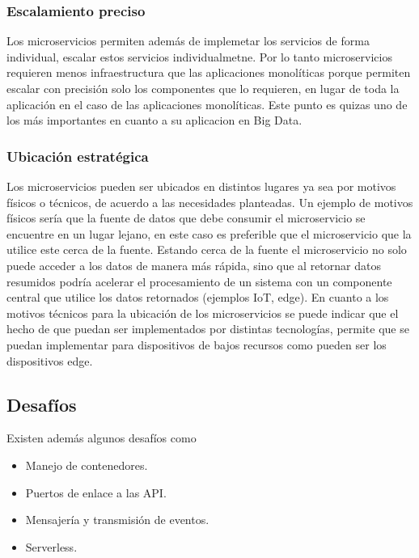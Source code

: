 \subsubsection{Escalamiento preciso}

    Los microservicios permiten además de implemetar los servicios de forma individual, escalar estos servicios individualmetne. Por lo tanto microservicios requieren menos infraestructura que las aplicaciones monolíticas porque permiten escalar con precisión solo los componentes que lo requieren, en lugar de toda la aplicación en el caso de las aplicaciones monolíticas. Este punto es quizas uno de los más importantes en cuanto a su aplicacion en Big Data.\par
    
\subsubsection{Ubicación estratégica}

    Los microservicios pueden ser ubicados en distintos lugares ya sea por motivos físicos o técnicos, de acuerdo a las necesidades planteadas. Un ejemplo de motivos físicos sería que la fuente de datos que debe consumir el microservicio se encuentre en un lugar lejano, en este caso es preferible que el microservicio que la utilice este cerca de la fuente. Estando cerca de la fuente el microservicio no solo puede acceder a los datos de manera más rápida, sino que al retornar datos resumidos podría acelerar el procesamiento de un sistema con un componente central que utilice los datos retornados (ejemplos IoT, edge). En cuanto a los motivos técnicos para la ubicación de los microservicios se puede indicar que el hecho de que puedan ser implementados por distintas tecnologías, permite que se puedan implementar para dispositivos de bajos recursos como pueden ser los dispositivos edge.\par


\subsection{Desafíos}
Existen además algunos desafíos como \cite{ibmmicroservicios}
\begin{itemize}
    \item Manejo de contenedores.
    \item Puertos de enlace a las API.
    \item Mensajería y transmisión de eventos.
    \item Serverless.
\end{itemize}

